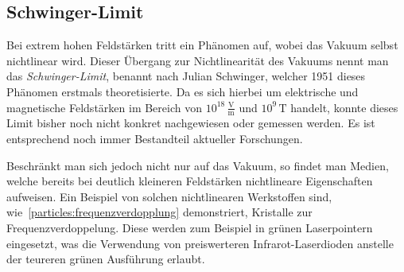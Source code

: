 

\subsection{Schwinger-Limit}\label{particles:section:lin-medium:schwinger}
Bei extrem hohen Feldstärken tritt ein Phänomen auf, wobei das Vakuum selbst nichtlinear wird.
Dieser Übergang zur Nichtlinearität des Vakuums nennt man das \emph{Schwinger-Limit}, benannt nach Julian Schwinger, welcher 1951 dieses Phänomen erstmals theoretisierte.
Da es sich hierbei um elektrische und magnetische Feldstärken im Bereich von $10^{18}\,\frac{\text{V}}{\text{m}}$ und $10^9\,\text{T}$ handelt, konnte dieses Limit bisher noch nicht konkret nachgewiesen oder gemessen werden.
Es ist entsprechend noch immer Bestandteil aktueller Forschungen. 

Beschränkt man sich jedoch nicht nur auf das Vakuum, so findet man Medien, welche bereits bei deutlich kleineren Feldstärken nichtlineare Eigenschaften aufweisen.
Ein Beispiel von solchen nichtlinearen Werkstoffen sind, wie~\ref{particles:frequenzverdopplung} demonstriert, Kristalle zur Frequenzverdoppelung.
Diese werden zum Beispiel in grünen Laserpointern eingesetzt, was die Verwendung von preiswerteren Infrarot-Laserdioden anstelle der teureren grünen Ausführung erlaubt.
